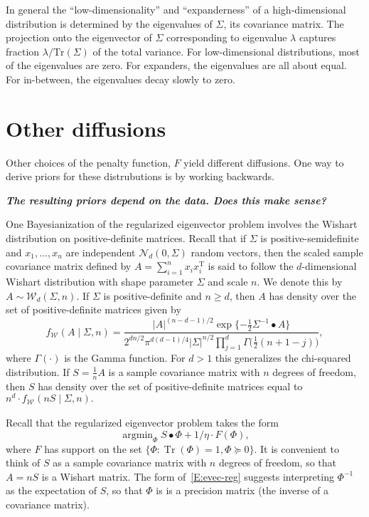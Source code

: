 \documentclass{article}
\newcommand{\trans}{\mathrm{T}}
\DeclareMathOperator*{\Tr}{Tr}
\newcommand{\Normal}[1][]{\mathcal{N}_{#1}}
\newcommand{\Wishart}[1][]{\mathcal{W}_{#1}}
\DeclareMathOperator*{\argmin}{argmin}
\begin{document}
In general the ``low-dimensionality'' and ``expanderness'' of a
high-dimensional distribution is determined by the eigenvalues of $\Sigma$,
its covariance matrix.  The projection onto the eigenvector of $\Sigma$
corresponding to eigenvalue $\lambda$ captures fraction
$\lambda / \mathrm{Tr}(\Sigma)$ of the total variance.  For low-dimensional
distributions, most of the eigenvalues are zero.  For expanders, the
eigenvalues are all about equal.  For in-between, the eigenvalues decay
slowly to zero.


\section{Other diffusions}

Other choices of the penalty function, $F$ yield different diffusions.  One way to derive priors for these distrubutions is by working backwards.

\textit{\textbf{The resulting priors depend on the data.  Does this make sense?}}


One Bayesianization of the regularized eigenvector problem involves the Wishart
distribution on positive-definite matrices.  Recall that if $\Sigma$ is
positive-semidefinite and $x_1, \ldots, x_n$ are independent
$\Normal[d](0, \Sigma)$ random vectors, then the scaled sample covariance matrix
defined by $A = \sum_{i=1}^n x_i x_i^\trans$ is said to follow the $d$-dimensional
Wishart distribution with shape parameter $\Sigma$ and scale $n$.  We denote
this by $A \sim \Wishart[d](\Sigma, n)$.  If $\Sigma$ is positive-definite and $n \geq d$, then
$A$ has density over the set of positive-definite matrices given by
\[
    f_{\Wishart}(A \mid \Sigma, n)
    =
    \frac{
        |A|^{(n-d-1)/2} \exp\{-\tfrac{1}{2} \Sigma^{-1} \bullet A \}
    }{
        2^{dn/2} \pi^{d(d-1)/4}
        |\Sigma|^{n/2}
        \prod_{j=1}^{d} \Gamma\big(\tfrac{1}{2} (n + 1 - j)\big)
    },
\]
where $\Gamma(\cdot)$ is the Gamma function.  For $d > 1$ this generalizes the
chi-squared distribution.  If $S = \tfrac{1}{n} A$ is a sample covariance matrix
with $n$ degrees of freedom, then $S$ has density over the set of
positive-definite matrices equal to
\(
    n^d \cdot f_{\Wishart}(n S \mid \Sigma, n).
\)

Recall that the regularized eigenvector problem takes the form
\begin{equation}\label{E:evec-reg}
    \argmin_{\Phi}
        S \bullet \Phi
        +
        1/\eta \cdot F(\Phi),
\end{equation}
where $F$ has support on the set 
\(
    \{ \Phi : \Tr(\Phi) = 1, \Phi \succeq 0 \}.
\)
It is convenient to think of $S$ as a sample covariance matrix with $n$ degrees
of freedom, so that $A = n S$ is a Wishart matrix.
The form of~\eqref{E:evec-reg} suggests interpreting $\Phi^{-1}$ as the
expectation of $S$, so that $\Phi$ is is a precision matrix
(the inverse of a covariance matrix).
\end{document}
